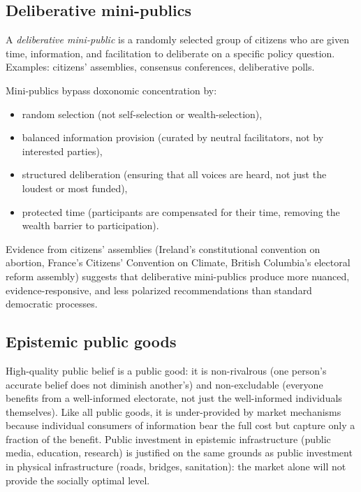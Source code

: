 \subsection{Deliberative mini-publics}

\begin{definition}
\label{def:mini-public}
A \emph{deliberative mini-public} is a randomly selected group of citizens who are given time, information, and facilitation to deliberate on a specific policy question.
Examples: citizens' assemblies, consensus conferences, deliberative polls.
\end{definition}

Mini-publics bypass doxonomic concentration by:
\begin{itemize}[nosep]
  \item random selection (not self-selection or wealth-selection),
  \item balanced information provision (curated by neutral facilitators, not by interested parties),
  \item structured deliberation (ensuring that all voices are heard, not just the loudest or most funded),
  \item protected time (participants are compensated for their time, removing the wealth barrier to participation).
\end{itemize}

Evidence from citizens' assemblies (Ireland's constitutional convention on abortion, France's Citizens' Convention on Climate, British Columbia's electoral reform assembly) suggests that deliberative mini-publics produce more nuanced, evidence-responsive, and less polarized recommendations than standard democratic processes.

\subsection{Epistemic public goods}

\begin{proposition}
\label{prop:epistemic-public-good}
High-quality public belief is a public good: it is non-rivalrous (one person's accurate belief does not diminish another's) and non-excludable (everyone benefits from a well-informed electorate, not just the well-informed individuals themselves).
Like all public goods, it is under-provided by market mechanisms because individual consumers of information bear the full cost but capture only a fraction of the benefit.
Public investment in epistemic infrastructure (public media, education, research) is justified on the same grounds as public investment in physical infrastructure (roads, bridges, sanitation): the market alone will not provide the socially optimal level.
\end{proposition}

